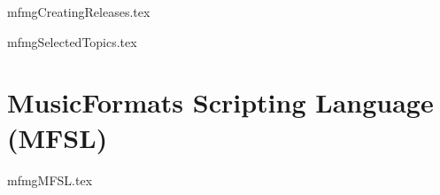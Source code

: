 \documentclass[11pt,a4paper]{report}
\begin{document}
{mfmgCreatingReleases.tex}



{mfmgSelectedTopics.tex}

%
%
%
%
%
%

%
%
%
%
%
%
%
%
%
%
%
%
%
%
%
%
%
%
%
%
%
%
%
%
%
%


\part{MusicFormats Scripting Language (MFSL)}

{mfmgMFSL.tex}
\end{document}
